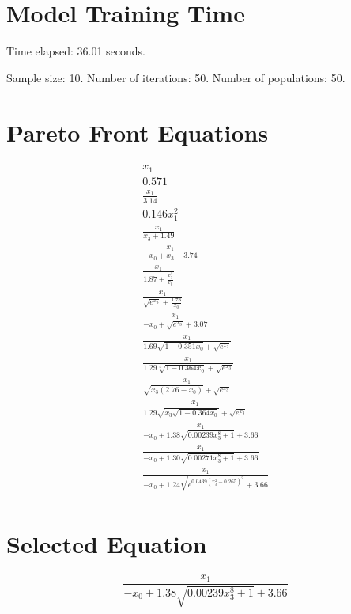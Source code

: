 \documentclass{article}
\begin{document}
\section*{Model Training Time}
Time elapsed: 36.01 seconds.

Sample size: 10.
Number of iterations: 50.
Number of populations: 50.

\section*{Pareto Front Equations}
\begin{align*}
x_{1} \\
0.571 \\
\frac{x_{1}}{3.14} \\
0.146 x_{1}^{2} \\
\frac{x_{1}}{x_{3} + 1.49} \\
\frac{x_{1}}{- x_{0} + x_{3} + 3.74} \\
\frac{x_{1}}{1.87 + \frac{x_{3}^{2}}{x_{0}}} \\
\frac{x_{1}}{\sqrt{e^{x_{3}}} + \frac{1.73}{x_{0}}} \\
\frac{x_{1}}{- x_{0} + \sqrt{e^{x_{3}}} + 3.07} \\
\frac{x_{1}}{1.69 \sqrt{1 - 0.351 x_{0}} + \sqrt{e^{x_{3}}}} \\
\frac{x_{1}}{1.29 \sqrt[4]{1 - 0.364 x_{0}} + \sqrt{e^{x_{3}}}} \\
\frac{x_{1}}{\sqrt{x_{3} \left(2.76 - x_{0}\right)} + \sqrt{e^{x_{3}}}} \\
\frac{x_{1}}{1.29 \sqrt{x_{3} \sqrt{1 - 0.364 x_{0}}} + \sqrt{e^{x_{3}}}} \\
\frac{x_{1}}{- x_{0} + 1.38 \sqrt{0.00239 x_{3}^{8} + 1} + 3.66} \\
\frac{x_{1}}{- x_{0} + 1.30 \sqrt{0.00271 x_{3}^{8} + 1} + 3.66} \\
\frac{x_{1}}{- x_{0} + 1.24 \sqrt{e^{0.0439 \left(x_{3}^{2} - 0.265\right)^{2}}} + 3.66} \\
\end{align*}

\section*{Selected Equation}
\[ \frac{x_{1}}{- x_{0} + 1.38 \sqrt{0.00239 x_{3}^{8} + 1} + 3.66} \]
\end{document}
